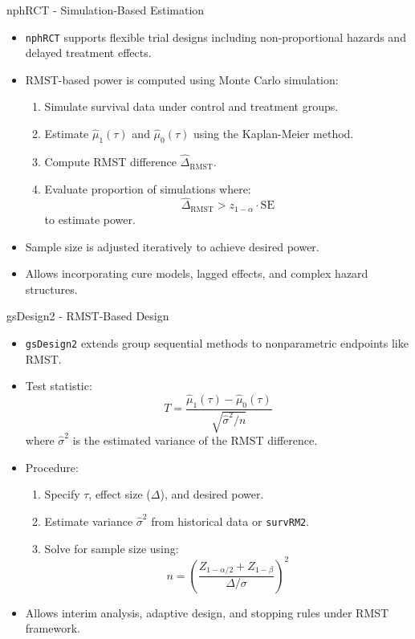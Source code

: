 \documentclass{beamer}
\begin{document}
\begin{frame}{nphRCT - Simulation-Based Estimation}
\begin{itemize}
    \item \texttt{nphRCT} supports flexible trial designs including non-proportional hazards and delayed treatment effects.

    \item RMST-based power is computed using Monte Carlo simulation:
    \begin{enumerate}
        \item Simulate survival data under control and treatment groups.
        \item Estimate $\hat{\mu}_1(\tau)$ and $\hat{\mu}_0(\tau)$ using the Kaplan-Meier method.
        \item Compute RMST difference $\hat{\Delta}_{\text{RMST}}$.
        \item Evaluate proportion of simulations where:
        \[
        \hat{\Delta}_{\text{RMST}} > z_{1-\alpha} \cdot \text{SE}
        \]
        to estimate power.
    \end{enumerate}

    \item Sample size is adjusted iteratively to achieve desired power.
    \item Allows incorporating cure models, lagged effects, and complex hazard structures.
\end{itemize}
\end{frame}

\begin{frame}{gsDesign2 - RMST-Based Design}
\begin{itemize}
    \item \texttt{gsDesign2} extends group sequential methods to nonparametric endpoints like RMST.

    \item Test statistic:
    \[
    T = \frac{\hat{\mu}_1(\tau) - \hat{\mu}_0(\tau)}{\sqrt{\hat{\sigma}^2 / n}}
    \]
    where $\hat{\sigma}^2$ is the estimated variance of the RMST difference.

    \item Procedure:
    \begin{enumerate}
        \item Specify $\tau$, effect size ($\Delta$), and desired power.
        \item Estimate variance $\hat{\sigma}^2$ from historical data or \texttt{survRM2}.
        \item Solve for sample size using:
        \[
        n = \left( \frac{Z_{1-\alpha/2} + Z_{1-\beta}}{\Delta / \sigma} \right)^2
        \]
    \end{enumerate}

    \item Allows interim analysis, adaptive design, and stopping rules under RMST framework.
\end{itemize}
\end{frame}
\end{document}
